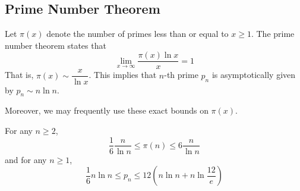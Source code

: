 \subsection{Prime Number Theorem}
\begin{theorem}\label{thm:pnt}
	Let \(\pi(x)\) denote the number of primes less than or equal to \(x \geq 1\). The prime number theorem states that 
	\begin{equation*}
		\lim_{x \to \infty} \dfrac{\pi(x) \ln x}{x} = 1
	\end{equation*}
	That is, \(\pi(x) \sim \dfrac{x}{\ln x}\). This implies that \(n\)-th prime \(p_n\) is asymptotically given by \(p_n \sim n \ln n\).
\end{theorem}

Moreover, we may frequently use these exact bounds on \(\pi(x)\).
\begin{lemma}\label{lmm:ineqpnt}
	For any \(n \geq 2\), 
	\begin{equation*}
		\dfrac{1}{6} \dfrac{n}{\ln n} \leq \pi(n) \leq 6 \dfrac{n}{\ln n}
	\end{equation*}
	and for any \(n \geq 1\),
	\begin{equation*}
		\dfrac{1}{6} n \ln n \leq p_n \leq 12 (n \ln n + n \ln \frac{12}{e})
	\end{equation*}
\end{lemma}